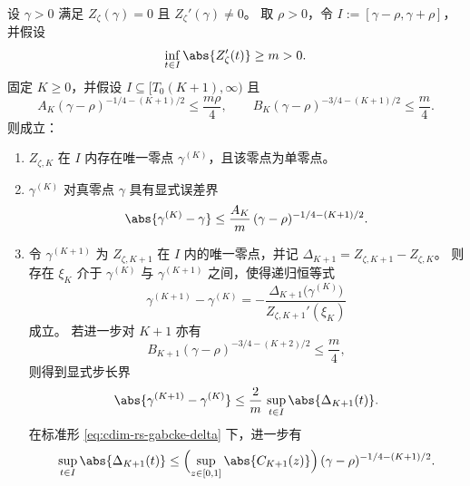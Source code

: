\begin{theorem}[层级截断诱导的单零点稳定性与递归步长界]\label{thm:cdim-rs-gabcke-local-zero-stability}
设 \(\gamma>0\) 满足 \(Z_{\zeta}(\gamma)=0\) 且 \(Z_{\zeta}'(\gamma)\neq 0\)。
取 \(\rho>0\)，令 \(I:=[\gamma-\rho,\gamma+\rho]\)，并假设
\begin{equation}\label{eq:cdim-rs-gabcke-local-slope}
\inf_{t\in I}\abs{Z_{\zeta}'(t)}\ge m>0.
\end{equation}
固定 \(K\ge 0\)，并假设 \(I\subseteq[T_0(K+1),\infty)\) 且
\begin{equation}\label{eq:cdim-rs-gabcke-local-smallness}
A_K(\gamma-\rho)^{-1/4-(K+1)/2}\le \frac{m\rho}{4},
\qquad
B_K(\gamma-\rho)^{-3/4-(K+1)/2}\le \frac{m}{4}.
\end{equation}
则成立：
\begin{enumerate}
  \item \(Z_{\zeta,K}\) 在 \(I\) 内存在唯一零点 \(\gamma^{(K)}\)，且该零点为单零点。
  \item \(\gamma^{(K)}\) 对真零点 \(\gamma\) 具有显式误差界
  \begin{equation}\label{eq:cdim-rs-gabcke-zero-location-bound}
  \abs{\gamma^{(K)}-\gamma}\le \frac{A_K}{m}\,(\gamma-\rho)^{-1/4-(K+1)/2}.
  \end{equation}
  \item 令 \(\gamma^{(K+1)}\) 为 \(Z_{\zeta,K+1}\) 在 \(I\) 内的唯一零点，并记 \(\Delta_{K+1}=Z_{\zeta,K+1}-Z_{\zeta,K}\)。
  则存在 \(\xi_K\) 介于 \(\gamma^{(K)}\) 与 \(\gamma^{(K+1)}\) 之间，使得递归恒等式
  \begin{equation}\label{eq:cdim-rs-gabcke-zero-recursion-identity}
  \gamma^{(K+1)}-\gamma^{(K)}=-\frac{\Delta_{K+1}\!\bigl(\gamma^{(K)}\bigr)}{Z_{\zeta,K+1}'(\xi_K)}
  \end{equation}
  成立。
  若进一步对 \(K{+}1\) 亦有
  \begin{equation}\label{eq:cdim-rs-gabcke-local-smallness-kp1}
  B_{K+1}(\gamma-\rho)^{-3/4-(K+2)/2}\le \frac{m}{4},
  \end{equation}
  则得到显式步长界
  \begin{equation}\label{eq:cdim-rs-gabcke-zero-step-bound}
  \abs{\gamma^{(K+1)}-\gamma^{(K)}}\le \frac{2}{m}\,\sup_{t\in I}\abs{\Delta_{K+1}(t)}.
  \end{equation}
  在标准形 \eqref{eq:cdim-rs-gabcke-delta} 下，进一步有
  \begin{equation}\label{eq:cdim-rs-gabcke-zero-step-bound-Ck}
  \sup_{t\in I}\abs{\Delta_{K+1}(t)}
  \le \Bigl(\sup_{z\in[0,1]}\abs{C_{K+1}(z)}\Bigr)\,(\gamma-\rho)^{-1/4-(K+1)/2}.
  \end{equation}
\end{enumerate}
\end{theorem}
